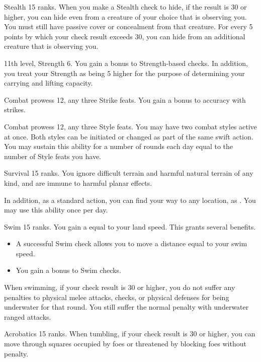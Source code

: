\featpre Stealth 15 ranks.
\featben When you make a Stealth check to hide, if the result is 30 or higher, you can hide even from a creature of your choice that is observing you.
You must still have passive cover or concealment from that creature.
For every 5 points by which your check result exceeds 30, you can hide from an additional creature that is observing you.

\featpres 11th level, Strength 6.
\featben You gain a  bonus to Strength-based checks.
In addition, you treat your Strength as being 5 higher for the purpose of determining your carrying and lifting capacity.

\featpres Combat prowess 12, any three Strike feats.
\featben You gain a  bonus to accuracy with strikes.

\featpres Combat prowess 12, any three Style feats.
\featben You may have two combat styles active at once.
Both styles can be initiated or changed as part of the same swift action.
You may sustain this ability for a number of rounds each day equal to the number of Style feats you have.

\featpre Survival 15 ranks.
\featben You ignore difficult terrain and harmful natural terrain of any kind, and are immune to harmful planar effects.

In addition, as a standard action, you can find your way to any location, as .
You may use this ability once per day.

\featpre Swim 15 ranks.
\featben You gain a  equal to your land speed.
This grants several benefits.
\begin{itemize}
    \item A successful Swim check allows you to move a distance equal to your swim speed.
    \item You gain a  bonus to Swim checks.
\end{itemize}

When swimming, if your check result is 30 or higher, you do not suffer any penalties to physical melee attacks, checks, or physical defenses for being underwater for that round.
You still suffer the normal penalty with underwater ranged attacks.

\featpre Acrobatics 15 ranks.
\featben When tumbling, if your check result is 30 or higher, you can move through squares occupied by foes or threatened by blocking foes without penalty.

